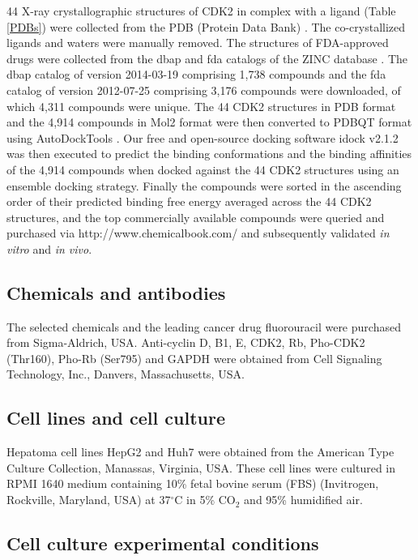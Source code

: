 \documentclass[10pt]{article}
\begin{document}
44 X-ray crystallographic structures of CDK2 in complex with a ligand (Table \ref{PDBs}) were collected from the PDB (Protein Data Bank) \cite{540,537}. The co-crystallized ligands and waters were manually removed. The structures of FDA-approved drugs were collected from the dbap and fda catalogs of the ZINC database \cite{532,1178}. The dbap catalog of version 2014-03-19 comprising 1,738 compounds and the fda catalog of version 2012-07-25 comprising 3,176 compounds were downloaded, of which 4,311 compounds were unique. The 44 CDK2 structures in PDB format and the 4,914 compounds in Mol2 format were then converted to PDBQT format using AutoDockTools \cite{596}. Our free and open-source docking software idock v2.1.2 \cite{1153,1362} was then executed to predict the binding conformations and the binding affinities of the 4,914 compounds when docked against the 44 CDK2 structures using an ensemble docking strategy. Finally the compounds were sorted in the ascending order of their predicted binding free energy averaged across the 44 CDK2 structures, and the top commercially available compounds were queried and purchased via http://www.chemicalbook.com/ and subsequently validated \textit{in vitro} and \textit{in vivo}.

\subsection*{Chemicals and antibodies}

The selected chemicals and the leading cancer drug fluorouracil were purchased from Sigma-Aldrich, USA. Anti-cyclin D, B1, E, CDK2, Rb, Pho-CDK2 (Thr160), Pho-Rb (Ser795) and GAPDH were obtained from Cell Signaling Technology, Inc., Danvers, Massachusetts, USA.

\subsection*{Cell lines and cell culture}

Hepatoma cell lines HepG2 and Huh7 were obtained from the American Type Culture Collection, Manassas, Virginia, USA. These cell lines were cultured in RPMI 1640 medium containing 10\% fetal bovine serum (FBS) (Invitrogen, Rockville, Maryland, USA) at 37$^\circ$C in 5\% CO$_2$ and 95\% humidified air.

\subsection*{Cell culture experimental conditions}
\end{document}
